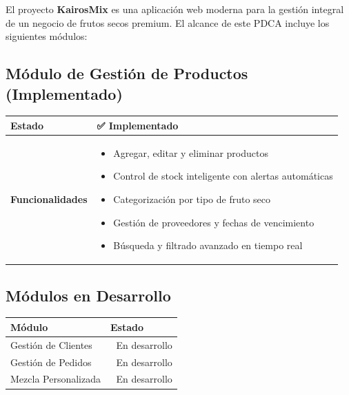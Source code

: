 \documentclass[12pt,a4paper]{report}
\begin{document}
El proyecto \textbf{KairosMix} es una aplicación web moderna para la gestión integral de un negocio de frutos secos premium. El alcance de este PDCA incluye los siguientes módulos:

\subsection{Módulo de Gestión de Productos (Implementado)}

\begin{table}[h]
    \centering
    \begin{tabular}{|l|p{8cm}|}
        \hline
        \textbf{Estado} & ✅ Implementado \\
        \hline
        \textbf{Funcionalidades} & 
            \begin{itemize}
                \item Agregar, editar y eliminar productos
                \item Control de stock inteligente con alertas automáticas
                \item Categorización por tipo de fruto seco
                \item Gestión de proveedores y fechas de vencimiento
                \item Búsqueda y filtrado avanzado en tiempo real
            \end{itemize} \\
        \hline
    \end{tabular}
\end{table}

\subsection{Módulos en Desarrollo}

\begin{table}[h]
    \centering
    \begin{tabular}{|l|p{8cm}|}
        \hline
        \textbf{Módulo} & \textbf{Estado} \\
        \hline
        Gestión de Clientes & 🚧 En desarrollo \\
        \hline
        Gestión de Pedidos & 🚧 En desarrollo \\
        \hline
        Mezcla Personalizada & 🚧 En desarrollo \\
        \hline
    \end{tabular}
\end{table}
\end{document}
